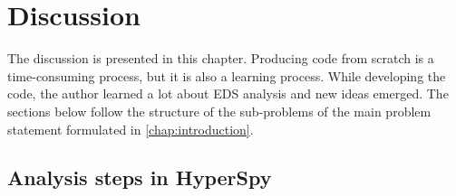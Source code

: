 \chapter{Discussion}
\label{chap:discussion}




The discussion is presented in this chapter.
Producing code from scratch is a time-consuming process, but it is also a learning process.
While developing the code, the author learned a lot about EDS analysis and new ideas emerged.
The sections below follow the structure of the sub-problems of the main problem statement formulated in \cref{chap:introduction}.

%
%


%
%
\section{Analysis steps in HyperSpy}
\label{sec:discussion:steps}

